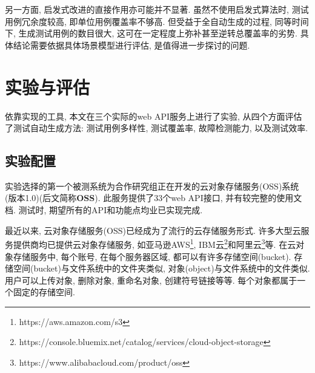         另一方面, 启发式改进的直接作用亦可能并不显著. 虽然不使用启发式算法时, 测试用例冗余度较高, 即单位用例覆盖率不够高. 但受益于全自动生成的过程, 同等时间下, 生成测试用例的数目很大, 这可在一定程度上弥补甚至逆转总覆盖率的劣势. 具体结论需要依据具体场景模型进行评估, 是值得进一步探讨的问题.
    

    \section{实验与评估}

        \label{sec:experiment}

        依靠实现的工具, 本文在三个实际的web API服务上进行了实验, 从四个方面评估了测试自动生成方法: 测试用例多样性, 测试覆盖率, 故障检测能力, 以及测试效率.
    
        \subsection{实验配置}
            实验选择的第一个被测系统为合作研究组正在开发的云对象存储服务(OSS)系统(版本1.0)(后文简称\textbf{OSS}). 此服务提供了33个web API接口, 并有较完整的使用文档. 测试时, 期望所有的API和功能点均业已实现完成.
            
            最近以来, 云对象存储服务(OSS)已经成为了流行的云存储服务形式. 许多大型云服务提供商均已提供云对象存储服务, 如亚马逊AWS\footnote{https://aws.amazon.com/s3}, IBM云\footnote{ https://console.bluemix.net/catalog/services/cloud-object-storage}和阿里云\footnote{ https://www.alibabacloud.com/product/oss}等. 在云对象存储服务中, 每个账号, 在每个服务器区域, 都可以有许多存储空间(bucket). 存储空间(bucket)与文件系统中的文件夹类似, 对象(object)与文件系统中的文件类似. 用户可以上传对象, 删除对象, 重命名对象, 创建符号链接等等. 每个对象都属于一个固定的存储空间.
            
